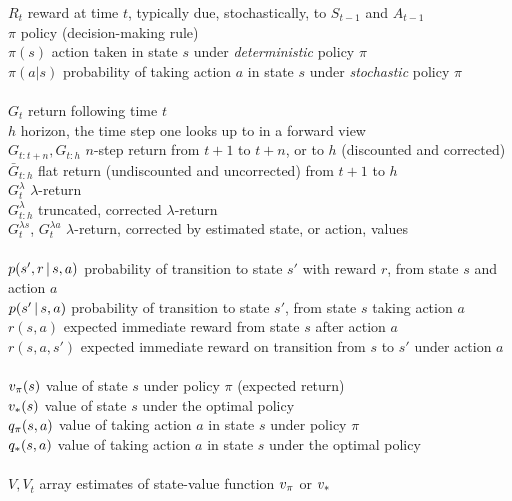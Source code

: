\documentclass[10pt,fleqn]{article}
\begin{document}
\begin{tabbing}
\>$R_t$               \> reward at time $t$, typically due, stochastically, to $S_{t-1}$ and $A_{t-1}$\\
\>$\pi$               \> policy (decision-making rule)\\
\>$\pi(s)$            \> action taken in state $s$ under {\it deterministic\/} policy $\pi$\\
\>$\pi(a|s)$          \> probability of taking action $a$ in state $s$ under {\it stochastic\/} policy $\pi$\\
\\
\>$G_t$               \> return following time $t$\\
\>$h$                 \> horizon, the time step one looks up to in a forward view\\
\>$G_{t:t+n}, G_{t:h}$\> $n$-step return from $t+1$ to $t+n$, or to $h$ (discounted and corrected) \\
\>$\bar G_{t:h}$      \> flat return (undiscounted and uncorrected) from $t+1$ to $h$\\
\>$G^\lambda_t$       \> $\lambda$-return\\
\>$G^\lambda_{t:h}$   \> truncated, corrected $\lambda$-return\\
\>$G^{\lambda s}_t$, $G^{\lambda a}_t$    \> $\lambda$-return, corrected by estimated state, or action, values \\
\\
\>$\p(s',r|s,a)$      \> probability of transition to state $s'$ with reward $r$, from state $s$ and action $a$\\
\>$\p(s'|s,a)$        \> probability of transition to state $s'$, from state $s$ taking action $a$\\
\>$r(s,a)$            \> expected immediate reward from state $s$ after action $a$\\
\>$r(s,a,s')$         \> expected immediate reward on transition from $s$ to $s'$ under action $a$\\
\\
\>$v_\pi(s)$           \> value of state $s$ under policy $\pi$ (expected return)\\
\>$v_*(s)$         \> value of state $s$ under the optimal policy \\
\>$q_\pi(s,a)$         \> value of taking action $a$ in state $s$ under policy $\pi$\\
\>$q_*(s,a)$       \> value of taking action $a$ in state $s$ under the optimal policy \\
\\
\>$V, V_t$            \> array estimates of state-value function $v_\pi$ or $v_*$\\

\end{tabbing}
\end{document}
